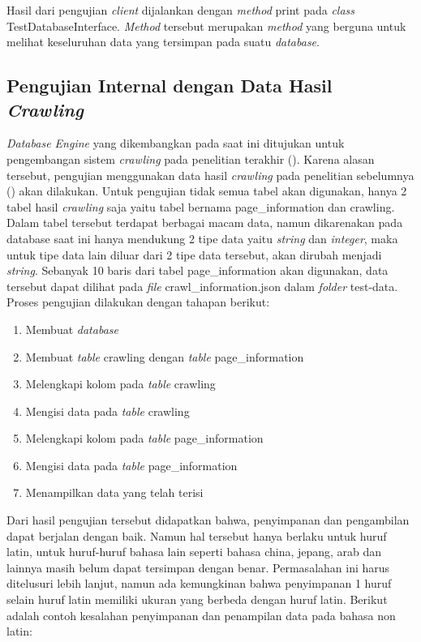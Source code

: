 Hasil dari pengujian \emph{client} dijalankan dengan \emph{method} print pada \emph{class} TestDatabaseInterface. \emph{Method} tersebut merupakan \emph{method} yang berguna untuk melihat keseluruhan
data yang tersimpan pada suatu \emph{database}.

\subsection{Pengujian Internal dengan Data Hasil \emph{Crawling}}
\emph{Database Engine} yang dikembangkan pada saat ini ditujukan untuk pengembangan sistem \emph{crawling} pada penelitian terakhir (\cite{ridho2024}). Karena alasan tersebut, pengujian menggunakan
data hasil \emph{crawling} pada penelitian sebelumnya (\cite{ridho2024}) akan dilakukan. Untuk pengujian tidak semua tabel akan digunakan, hanya 2 tabel hasil \emph{crawling} saja yaitu tabel bernama page\_information dan crawling.
Dalam tabel tersebut terdapat berbagai macam data, namun dikarenakan pada database saat ini hanya mendukung 2 tipe data yaitu \emph{string} dan \emph{integer}, maka untuk tipe data lain diluar dari 2 tipe data tersebut,
akan dirubah menjadi \emph{string}. Sebanyak 10 baris dari tabel page\_information akan digunakan, data tersebut dapat dilihat pada \emph{file} crawl\_information.json dalam \emph{folder} test-data.
Proses pengujian dilakukan dengan tahapan berikut:

\begin{enumerate}
	\item Membuat \emph{database}
	\item Membuat \emph{table} crawling dengan \emph{table} page\_information
	\item Melengkapi kolom pada \emph{table} crawling
	\item Mengisi data pada \emph{table} crawling
	\item Melengkapi kolom pada \emph{table} page\_information
	\item Mengisi data pada \emph{table} page\_information
	\item Menampilkan data yang telah terisi
\end{enumerate}

Dari hasil pengujian tersebut didapatkan bahwa, penyimpanan dan pengambilan dapat berjalan dengan baik. Namun hal tersebut hanya berlaku untuk huruf latin, untuk huruf-huruf bahasa lain seperti
bahasa china, jepang, arab dan lainnya masih belum dapat tersimpan dengan benar. Permasalahan ini harus ditelusuri lebih lanjut, namun ada kemungkinan bahwa penyimpanan 1 huruf selain huruf latin memiliki
ukuran yang berbeda dengan huruf latin. Berikut adalah contoh kesalahan penyimpanan dan penampilan data pada bahasa non latin:

